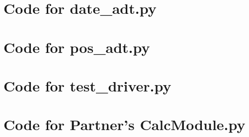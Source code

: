 \documentclass[12pt]{article}
\begin{document}
\def\thesection{\Alph{section}}

\section{Code for date\_adt.py}

\noindent 

\newpage

\section{Code for pos\_adt.py}

\noindent 

\newpage

\section{Code for test\_driver.py}

\noindent 

\newpage

\section{Code for Partner's CalcModule.py}

\noindent 
\end{document}
